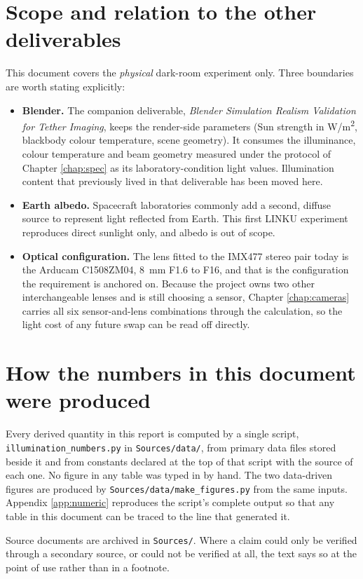 \section*{Scope and relation to the other deliverables}

This document covers the \emph{physical} dark-room experiment only. Three boundaries are worth stating explicitly:

\begin{itemize}
    \item \textbf{Blender.} The companion deliverable, \textit{Blender Simulation Realism Validation for Tether Imaging}, keeps the render-side parameters (Sun strength in W/m\textsuperscript{2}, blackbody colour temperature, scene geometry). It consumes the illuminance, colour temperature and beam geometry measured under the protocol of Chapter \ref{chap:spec} as its laboratory-condition light values. Illumination content that previously lived in that deliverable has been moved here.
    \item \textbf{Earth albedo.} Spacecraft laboratories commonly add a second, diffuse source to represent light reflected from Earth. This first LINKU experiment reproduces direct sunlight only, and albedo is out of scope.
    \item \textbf{Optical configuration.} The lens fitted to the IMX477 stereo pair today is the Arducam C1508ZM04, 8~mm F1.6 to F16, and that is the configuration the requirement is anchored on. Because the project owns two other interchangeable lenses and is still choosing a sensor, Chapter \ref{chap:cameras} carries all six sensor-and-lens combinations through the calculation, so the light cost of any future swap can be read off directly.
\end{itemize}

\section*{How the numbers in this document were produced}

Every derived quantity in this report is computed by a single script, \texttt{illumination\_numbers.py} in \texttt{Sources/data/}, from primary data files stored beside it and from constants declared at the top of that script with the source of each one. No figure in any table was typed in by hand. The two data-driven figures are produced by \texttt{Sources/data/make\_figures.py} from the same inputs. Appendix \ref{app:numeric} reproduces the script's complete output so that any table in this document can be traced to the line that generated it.

Source documents are archived in \texttt{Sources/}. Where a claim could only be verified through a secondary source, or could not be verified at all, the text says so at the point of use rather than in a footnote.
